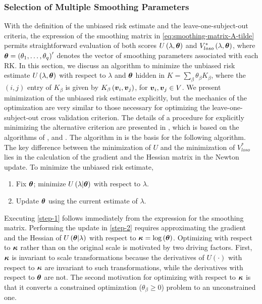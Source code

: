 \subsubsection{Selection of Multiple Smoothing Parameters}

With the definition of the unbiased risk estimate and the leave-one-subject-out criteria, the expression of the smoothing matrix in \eqref{eq:smoothing-matrix-A-tilde} permits straightforward evaluation of both scores $U\left(\lambda, \mbox{\boldmath $\theta$} \right)$ and $V_{loso}^*\left(\lambda, \mbox{\boldmath $\theta$} \right)$, where $\mbox{\boldmath $\theta$} = \left(\theta_1,\dots, \theta_q\right)'$ denotes the vector of smoothing parameters associated with each RK.  In this section, we discuss an algorithm to minimize the unbiased risk estimate $U\left(\lambda, \mbox{\boldmath $\theta$}\right)$ with respect to $\lambda$ and $\mbox{\boldmath $\theta$}$ hidden in $K = \sum_{\beta} \theta_\beta K_\beta$, where the $\left(i,j\right)$ entry of $K_\beta$ is given by $K_\beta\left(\mbox{\boldmath $v$}_i,\mbox{\boldmath $v$}_j\right)$, for $\mbox{\boldmath $v$}_i,\mbox{\boldmath $v$}_j \in V$.  We present minimization of the unbiased risk estimate explicitly, but the mechanics of the optimization are very similar to those necessary for optimizing the leave-one-subject-out cross validation criterion. The details of a procedure for explicitly minimizing the alternative criterion are presented in \cite{xu2012asymptotic}, which is based on the algorithms of \cite{gu1991minimizing}, \cite{kim2004smoothing} and \cite{wood2004stable}. The algorithm in \cite{kim2004smoothing} is the basis for the following algorithm. The key difference between the minimization of $U$ and the minimization of $V^*_{loso}$ lies in the calculation of the gradient and the Hessian matrix in the Newton update. To minimize the unbiased risk estimate,

\begin{enumerate}
\item Fix $\mbox{\boldmath $\theta$}$; minimize $U\left(\lambda \vert \mbox{\boldmath $\theta$}\right)$ with respect to $\lambda$.\label{step-1}
\item Update $\mbox{\boldmath $\theta$}$ using the current estimate of $\lambda$. \label{step-2}
\end{enumerate}

\noindent
Executing \ref{step-1} follows immediately from the expression for the smoothing matrix. Performing the update in \ref{step-2} requires approximating the gradient and the Hessian of $U\left( \mbox{\boldmath $\theta$} \vert \lambda \right)$ with respect to $\mbox{\boldmath $\kappa$} = \log\left(\mbox{\boldmath $\theta$}\right)$. Optimizing with respect to $\mbox{\boldmath $\kappa$}$ rather than on the original scale is motivated by two driving factors. First, $\mbox{\boldmath $\kappa$}$ is invariant to scale transformations because the derivatives of $U\left(\cdot\right)$ with respect to $\mbox{\boldmath $\kappa$}$ are invariant to such transformations, while the derivatives with respect to $\mbox{\boldmath $\theta$}$ are not. The second motivation for optimizing with respect to $\mbox{\boldmath $\kappa$}$ is that it converts a constrained optimization ($\theta_\beta \ge 0$) problem to an unconstrained one.

